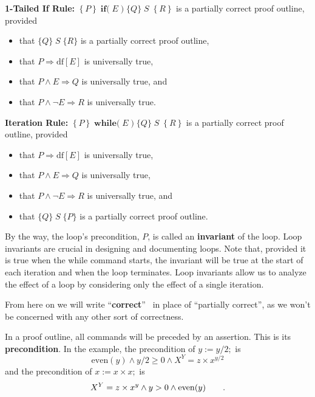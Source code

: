 \documentclass[muchmore,11pt]{article}%
\begin{document}
\textbf{1-Tailed If Rule:} $\left\{  P\right\}  \;\mathbf{if(}%
\;E\;)\;\{Q\}\;S\;\left\{  R\right\}  $ is a partially correct proof outline, provided

\begin{itemize}
\item that $\{Q\}\;S\;\{R\}$ is a partially correct proof outline,

\item that $P\Rightarrow\mathrm{df}[E]$ is universally true,

\item that $P\wedge E\Rightarrow Q$ is universally true, and

\item that $P\wedge\lnot E\Rightarrow R$ is universally true.
\end{itemize}

\textbf{Iteration Rule:} $\left\{  P\right\}  \;\mathbf{while(}%
\;E\;)\;\{Q\}\;S\;\left\{  R\right\}  $ is a partially correct proof outline, provided

\begin{itemize}
\item that $P\Rightarrow\mathrm{df}[E]$ is universally true,

\item that $P\wedge E\Rightarrow Q$ is universally true,

\item that $P\wedge\lnot E\Rightarrow R$ is universally true, and

\item that $\{Q\}\;S\;\{P\}$ is a partially correct proof outline.
\end{itemize}

By the way, the loop's precondition, $P$, is called an \textbf{invariant} of
the loop. Loop invariants are crucial in designing and documenting loops. Note
that, provided it is true when the while command starts, the invariant will be
true at the start of each iteration and when the loop terminates. Loop
invariants allow us to analyze the effect of a loop by considering only the
effect of a single iteration.

From here on we will write \textquotedblleft\textbf{correct}\textquotedblright%
\ in place of \textquotedblleft partially correct\textquotedblright, as we
won't be concerned with any other sort of correctness.

In a proof outline, all commands will be preceded by an assertion. This is its
\textbf{precondition}. In the example, the precondition of $y:=y/2;$ is
\[
\mathrm{even}(y)\wedge y/2\geq0\wedge X^{Y}=z\times x^{y/2}%
\]
and the precondition of $x:=x\times x;$ is%
\[
X^{Y}=z\times x^{y}\wedge y>0\wedge\mathrm{even}(y)\text{\qquad.}%
\]
\end{document}
